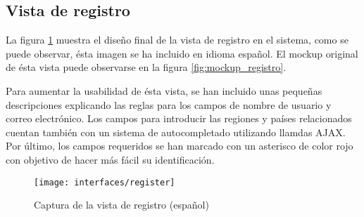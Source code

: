 \subsection{Vista de registro}
La figura \ref{fig:interface_registro} muestra el diseño final de la vista de registro en el sistema,  como se puede observar, ésta imagen se ha incluido en idioma español.  El mockup original de ésta vista puede observarse en la figura \ref{fig:mockup_registro}.

Para aumentar la usabilidad de ésta vista, se han incluido unas pequeñas descripciones explicando las reglas para los campos de nombre de usuario y correo electrónico.  Los campos para introducir las regiones y países relacionados cuentan también con un sistema de autocompletado utilizando llamdas AJAX.  Por último, los campos requeridos se han marcado con un asterisco de color rojo con objetivo de hacer más fácil su identificación.
\begin{figure}[h]
	\centering
	\texttt{[image: interfaces/register]}
	\caption{Captura de la vista de registro (español)}
	\label{fig:interface_registro}
\end{figure}


